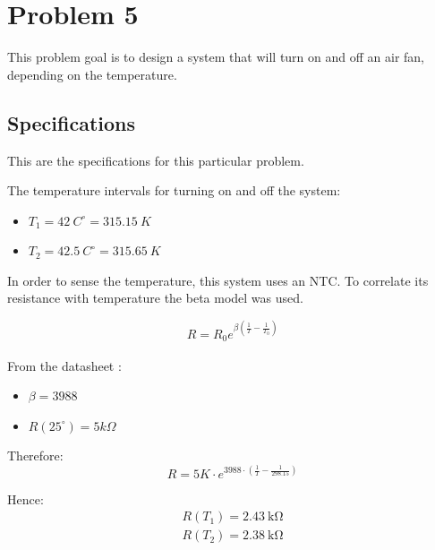 \section{Problem 5}

This problem goal is to design a system that will turn on and off an air fan, depending on the temperature.

\subsection{Specifications}

This are the specifications for this particular problem.

The temperature intervals for turning on and off the system:
\begin{itemize}
        
    \item $T_1 = 42~C^\circ   =  315.15 ~K$
    \item $T_2 = 42.5~C^\circ =  315.65 ~K$

\end{itemize}

In order to sense the temperature, this system uses an NTC. To correlate its resistance with temperature the beta model was used. 

\begin{equation}
    R = R_0 e^{\beta\left ( \frac{1}{T} - \frac{1}{T_0 } \right )}
\end{equation}

From the datasheet \textsuperscript{\cite{NTC_datasheet}} :

\begin{itemize}
    \item $\beta = 3988$
    \item $R(25^{\circ}) = 5k\Omega$ 
\end{itemize}

Therefore: 
\begin{equation}
    R = 5K\cdot e^{ 3988\cdot \left ( \frac{1}{T} - \frac{1}{298.15 } \right )}
\end{equation}

Hence: 
\begin{equation}
    \begin{aligned}   
        R(T_1) = \SI{2.43}{\kilo\ohm} \\
        R(T_2) = \SI{2.38}{\kilo\ohm}
    \end{aligned}
\end{equation}

